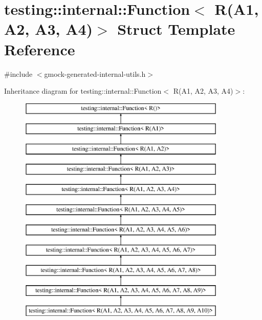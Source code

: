 \hypertarget{structtesting_1_1internal_1_1_function_3_01_r_07_a1_00_01_a2_00_01_a3_00_01_a4_08_4}{}\section{testing\+::internal\+::Function$<$ R(A1, A2, A3, A4)$>$ Struct Template Reference}
\label{structtesting_1_1internal_1_1_function_3_01_r_07_a1_00_01_a2_00_01_a3_00_01_a4_08_4}


{\ttfamily \#include $<$gmock-\/generated-\/internal-\/utils.\+h$>$}

Inheritance diagram for testing\+::internal\+::Function$<$ R(A1, A2, A3, A4)$>$\+:\begin{figure}[H]
\begin{center}
\leavevmode
\includegraphics[height=11.000000cm]{d2/df8/structtesting_1_1internal_1_1_function_3_01_r_07_a1_00_01_a2_00_01_a3_00_01_a4_08_4}
\end{center}
\end{figure}
